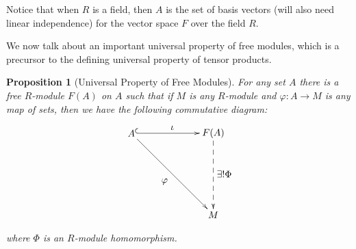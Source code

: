 \documentclass[11pt]{article}
\theoremstyle{definition}
\theoremstyle{plain}
\theoremstyle{plain}
\newtheorem{prop}{Proposition}
\theoremstyle{plain}
\theoremstyle{definition}
\begin{document}
Notice that when $R$ is a field, then $A$ is the set of basis vectors (will also need linear independence) for the vector space $F$ over the field $R$.

We now talk about an important universal property of free modules, which is a precursor to the defining universal property of tensor products.

\begin{prop}[Universal Property of Free Modules]
For any set $A$ there is a free $R$-module $F(A)$ on $A$ such that if $M$ is any $R$-module and $\varphi: A \to M$ is any map of sets, then we have the following commutative diagram:

\begin{equation*}
\begin{xy}
(0,0)*+{A}="v1"; (30,0)*+{F(A)}="v2"; (30, -30)*+{M}="v3";
{\ar@{^{(}->} "v1";"v2"}?*!/_2mm/{\iota};
{\ar "v1";"v3"}?*!/^4mm/{\varphi};
{\ar@{-->} "v2";"v3"}?*!/_4mm/{\exists ! \Phi}
\end{xy}
\end{equation*}

where $\Phi$ is an $R$-module homomorphism.
\end{prop}
\end{document}
